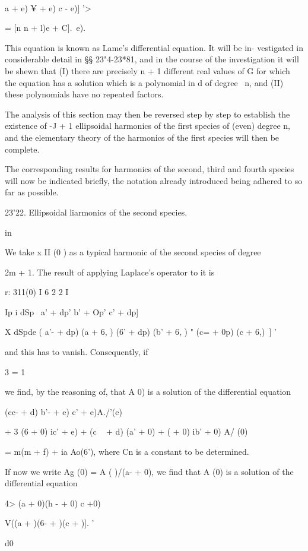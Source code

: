  \ \ {a + e) ¥ + e) c - e)] '>

= [n n + l)e + C].\, e).

This equation is known as Lame's differential equation. It will be in-
vestigated in considerable detail in §§ 23"4-23*81, and in the course
of the investigation it will be shewn that (I) there are precisely n +
1 different real values of G for which the equation has a solution
which is a polynomial in d of degree \ n, and (II) these polynomials
have no repeated factors.

The analysis of this section may then be reversed step by step to
establish the existence of -J + 1 ellipsoidal harmonics of the first
species of (even) degree n, and the elementary theory of the harmonics
of the first species will then be complete.

The corresponding results for harmonics of the second, third and
fourth species will now be indicated briefly, the notation already
introduced being adhered to so far as possible.

23'22. Ellipsoidal liarmonics of the second species.

in

We take x II (0 ) as a typical harmonic of the second species of
degree

2m + 1. The result of applying Laplace's operator to it is

r: 311(0) I 6 2 2 I

 Ip i dSp \ a' + dp' b' + Op' c' + dp]

   X dSpde ( a'- + dp) (a + 6, ) (6' + dp) (b' + 6, ) " (c= + 0p) (c +
6,)\ ] '

%
%

and this has to vanish. Consequently, if

3 = 1

we find, by the reasoning of, that A 0) is a solution of the
differential equation

(cc- + d) b'- + e) c' + e)A./'(e)

+ 3 (6 + 0) ic' + e) + (c ~ + d) (a' + 0) + ( + 0) ib' + 0) A/ (0)

= m(m + f) + ia Ao(6'), where Cn is a constant to be determined.

If now we write Ag (0) = A ( )/\/(a- + 0), we find that A (0) is a
solution of the differential equation

4> (a + 0)(h - + 0) c +0)

V((a + )(6- + )(c + )]. '

d0

}
